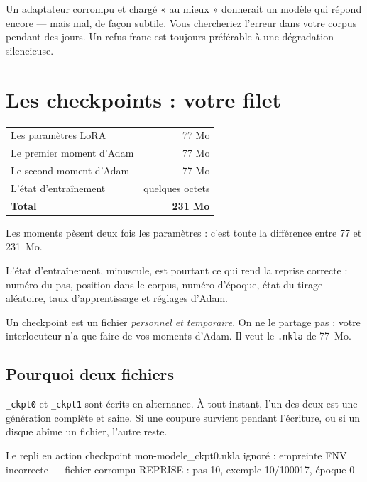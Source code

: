 \begin{nkpiege}
Un adaptateur corrompu et chargé « au mieux » donnerait un modèle qui répond
encore — mais mal, de façon subtile. Vous chercheriez l'erreur dans votre corpus
pendant des jours. Un refus franc est toujours préférable à une dégradation
silencieuse.
\end{nkpiege}

\section{Les checkpoints : votre filet}

\begin{center}
\begin{tabular}{p{5.2cm}r}
\toprule
Les paramètres LoRA & 77 Mo \\
Le premier moment d'Adam & 77 Mo \\
Le second moment d'Adam & 77 Mo \\
L'état d'entraînement & quelques octets \\
\midrule
\textbf{Total} & \textbf{231 Mo} \\
\bottomrule
\end{tabular}
\end{center}

Les moments pèsent deux fois les paramètres : c'est toute la différence entre 77
et 231~Mo.

L'état d'entraînement, minuscule, est pourtant ce qui rend la reprise correcte :
numéro du pas, position dans le corpus, numéro d'époque, état du tirage
aléatoire, taux d'apprentissage et réglages d'Adam.

\begin{nkretenir}
Un checkpoint est un fichier \emph{personnel et temporaire}. On ne le partage
pas : votre interlocuteur n'a que faire de vos moments d'Adam. Il veut le
\texttt{.nkla} de 77~Mo.
\end{nkretenir}

\subsection{Pourquoi deux fichiers}

\texttt{\_ckpt0} et \texttt{\_ckpt1} sont écrits en alternance. À tout instant,
l'un des deux est une génération complète et saine. Si une coupure survient
pendant l'écriture, ou si un disque abîme un fichier, l'autre reste.

\begin{nkcode}[]{Le repli en action}
checkpoint mon-modele_ckpt0.nkla ignoré :
  empreinte FNV incorrecte — fichier corrompu
REPRISE : pas 10, exemple 10/100017, époque 0
\end{nkcode}

